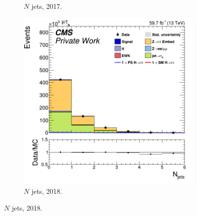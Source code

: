 \begin{figure}
\begin{subfigure}[b]{0.33\linewidth}
    \caption{$N$ jets, 2017.} 
    \vspace{0.5ex}
  \end{subfigure} 
    \begin{subfigure}[b]{0.33\linewidth}
    \centering
    \includegraphics[width=\linewidth]{Chapitre7/Images/CtrlPlots/2018/Njets.png} 
    \caption{$N$ jets, 2018.} 
    \vspace{0.5ex}
  \end{subfigure} 


\end{figure}
